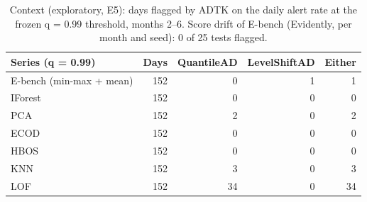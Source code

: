 \begin{table}[t]
\centering
\small
\caption{Context (exploratory, E5): days flagged by ADTK on the daily alert rate at the frozen q = 0.99 threshold, months 2--6. Score drift of E-bench (Evidently, per month and seed): 0 of 25 tests flagged.}
\label{tab:context}
\begin{tabular}{lrrrr}
\toprule
Series (q = 0.99) & Days & QuantileAD & LevelShiftAD & Either \\
\midrule
E-bench (min-max + mean) & 152 & 0 & 1 & 1 \\
IForest & 152 & 0 & 0 & 0 \\
PCA & 152 & 2 & 0 & 2 \\
ECOD & 152 & 0 & 0 & 0 \\
HBOS & 152 & 0 & 0 & 0 \\
KNN & 152 & 3 & 0 & 3 \\
LOF & 152 & 34 & 0 & 34 \\
\bottomrule
\end{tabular}
\end{table}
